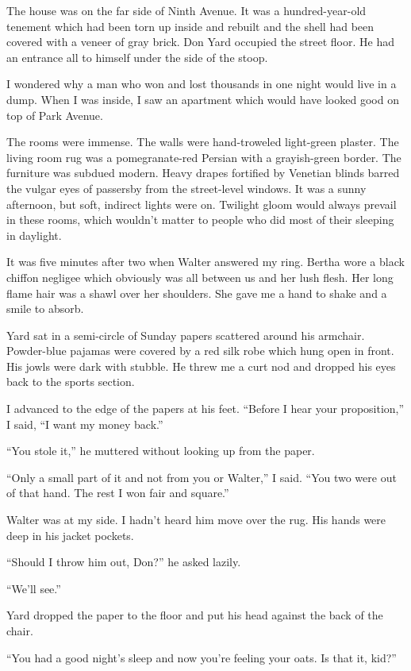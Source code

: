 \documentclass{novel}
\begin{document}
\scenestars

The house was on the far side of Ninth Avenue. It was a hundred-year-old tenement which had been torn up inside and rebuilt and the shell had been covered with a veneer of gray brick. Don Yard occupied the street floor. He had an entrance all to himself under the side of the stoop.

I wondered why a man who won and lost thousands in one night would live in a dump. When I was inside, I saw an apartment which would have looked good on top of Park Avenue. 

The rooms were immense. The walls were hand-troweled light-green plaster. The living room rug was a pomegranate-red Persian with a grayish-green border. The furniture was subdued modern. Heavy drapes fortified by Venetian blinds barred the vulgar eyes of passersby from the street-level windows. It was a sunny afternoon, but soft, indirect lights were on. Twilight gloom would always prevail in these rooms, which wouldn’t matter to people who did most of their sleeping in daylight.

It was five minutes after two when Walter answered my ring. Bertha wore a black chiffon negligee which obviously was all between us and her lush flesh. Her long flame hair was a shawl over her shoulders. She gave me a hand to shake and a smile to absorb.

Yard sat in a semi-circle of Sunday papers scattered around his armchair. Powder-blue pajamas were covered by a red silk robe which hung open in front. His jowls were dark with stubble. He threw me a curt nod and dropped his eyes back to the sports section.

I advanced to the edge of the papers at his feet. “Before I hear your proposition,” I said, “I want my money back.”

“You stole it,” he muttered without looking up from the paper.

“Only a small part of it and not from you or Walter,” I said. “You two were out of that hand. The rest I won fair and square.”

Walter was at my side. I hadn’t heard him move over the rug. His hands were deep in his jacket pockets. 

“Should I throw him out, Don?” he asked lazily.

“We’ll see.”

Yard dropped the paper to the floor and put his head against the back of the chair.

“You had a good night’s sleep and now you’re feeling your oats. Is that it, kid?”
\end{document}
